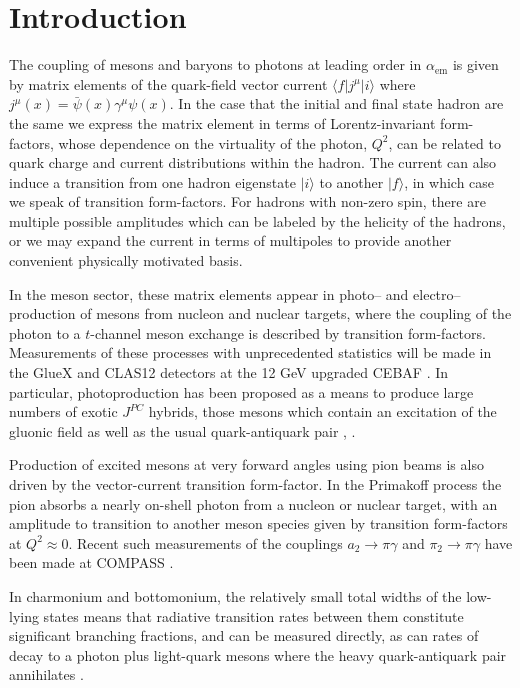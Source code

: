 \documentclass[twocolumn,amsmath,amssymb,prd,10pt,floatfix, 
superscriptaddress,nofootinbib, showpacs, preprintnumbers]{revtex4-1}
\begin{document}
%
\section{Introduction\label{sec::intro}}

The coupling of mesons and baryons to photons at leading order in $\alpha_{\mathrm{em}}$ is given by matrix elements of the quark-field vector current ${\big\langle f \big| j^\mu \big| i  \big\rangle}$ where ${j^\mu(x) = \bar{\psi}(x) \gamma^\mu \psi(x)}$. In the case that the initial and final state hadron are the same we express the matrix element in terms of Lorentz-invariant form-factors, whose dependence on the virtuality of the photon, $Q^2$, can be related to quark charge and current distributions within the hadron. The current can also induce a transition from one hadron eigenstate $\big| i \big\rangle$ to another $\big|f \big\rangle$, in which case we speak of transition form-factors. For hadrons with non-zero spin, there are multiple possible amplitudes which can be labeled by the helicity of the hadrons, or we may expand the current in terms of multipoles to provide another convenient physically motivated basis.

In the meson sector, these matrix elements appear in photo-- and electro--production of mesons from nucleon and nuclear targets, where the coupling of the photon to a $t$-channel meson exchange is described by transition form-factors. Measurements of these processes with unprecedented statistics will be made in the GlueX and CLAS12 detectors at the 12 GeV upgraded CEBAF \cite{Dudek:2012vr}. In particular, photoproduction has been proposed as a means to produce large numbers of exotic $J^{PC}$ hybrids, those mesons which contain an excitation of the gluonic field as well as the usual quark-antiquark pair \cite{Horn:1977rq, *Barnes:1982tx, *Chanowitz:1982qj, *Isgur:1985vy}, \cite{Dudek:2011bn}. 

Production of excited mesons at very forward angles using pion beams is also driven by the vector-current transition form-factor. In the Primakoff process the pion absorbs a nearly on-shell photon from a nucleon or nuclear target, with an amplitude to transition to another meson species given by transition form-factors at $Q^2 \approx 0$. Recent such measurements of the couplings $a_2 \to \pi \gamma$ and $\pi_2 \to \pi \gamma$ have been made at COMPASS \cite{Adolph:2014mup}. 

In charmonium and bottomonium, the relatively small total widths of the low-lying states means that radiative transition rates between them constitute significant branching fractions, and can be measured directly, as can rates of decay to a photon plus light-quark mesons where the heavy quark-antiquark pair annihilates \cite{PDG-2012, Ablikim:2011kv, *Ablikim:2011da, *Ablikim:2012sf, *Ablikim:2013hq}.
\end{document}
